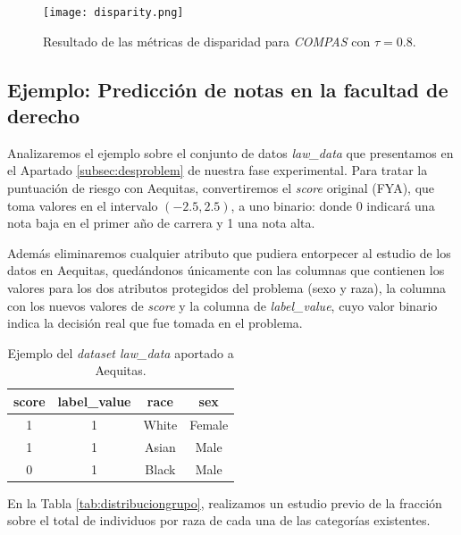 \clearpage

\begin{figure}[h]
	\hspace{-2.5cm}
	\texttt{[image: disparity.png]}
	\caption{Resultado de las métricas de disparidad para \textit{COMPAS} con $\tau=0.8$.}
    \label{fig:compasdisparity}
\end{figure}

\subsection{Ejemplo: Predicción de notas en la facultad de derecho} \label{ap:facultadderecho}

Analizaremos el ejemplo sobre el conjunto de datos \textit{law\_data} que presentamos en el Apartado \ref{subsec:desproblem} de nuestra fase experimental. Para tratar la puntuación de riesgo con Aequitas, convertiremos el \textit{score} original (FYA), que toma valores en el intervalo $(-2.5,2.5)$, a uno binario: donde 0 indicará una nota baja en el primer año de carrera y 1 una nota alta.

Además eliminaremos cualquier atributo que pudiera entorpecer al estudio de los datos en Aequitas, quedándonos  únicamente con las columnas que contienen los valores para los dos atributos protegidos del problema (sexo y raza), la columna con los nuevos valores de \textit{score} y la columna de \textit{label\_value}, cuyo valor binario indica la decisión real que fue tomada en el problema.

\clearpage

\begin{table}[h]
\centering
\resizebox{7.5cm}{!} {
\begin{tabular}{|c|c|c|c|}
\hline
\textbf{score} & \textbf{label\_value} & \textbf{race}    & \textbf{sex} \\ \hline
1            & 1                     & White & Female       \\ \hline
1              & 1                     & Asian         & Male      \\ \hline
0              & 1                     & Black       & Male              \\ \hline
\end{tabular}
}
\caption{Ejemplo del \textit{dataset law\_data} aportado a Aequitas.}
\label{tab:ejlawaeq}
\end{table}

En la Tabla \ref{tab:distribuciongrupo}, realizamos un estudio previo de la fracción sobre el total de individuos por raza de cada una de las categorías existentes.\\

